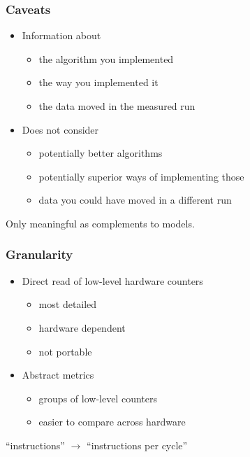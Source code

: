 \documentclass[dvipsnames,presentation,aspectratio=169,14pt]{beamer}
\begin{document}
\begin{frame}
  \frametitle{Caveats}

  \begin{itemize}[itemsep=8pt]
  \item Information about
    \begin{itemize}[itemsep=3pt]
    \item the algorithm you implemented
    \item the way you implemented it
    \item the data moved in the measured run
    \end{itemize}
  \item Does not consider
    \begin{itemize}[itemsep=3pt]
    \item potentially better algorithms
    \item potentially superior ways of implementing those
    \item data you could have moved in a different run
    \end{itemize}
  \end{itemize}

  \pause
  \vskip 5pt

  Only meaningful as complements to models.
\end{frame}

\begin{frame}
  \frametitle{Granularity}
  \begin{itemize}[itemsep=8pt]
  \item Direct read of low-level hardware counters
    \begin{itemize}[itemsep=4pt]
    \item most detailed
    \item hardware dependent
    \item not portable
    \end{itemize}
  \item Abstract metrics
    \begin{itemize}[itemsep=4pt]
    \item groups of low-level counters
    \item easier to compare across hardware
    \end{itemize}
  \end{itemize}

  \vskip 11pt

  ``instructions'' $\rightarrow$ ``instructions per cycle''

\end{frame}
\end{document}
